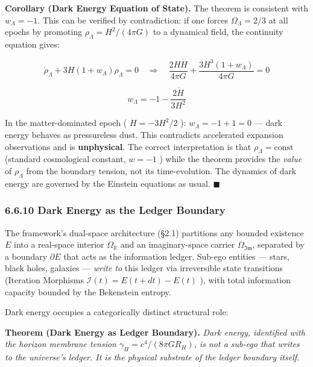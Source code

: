 \documentclass[11pt,a4paper]{article}
\theoremstyle{definition}
\theoremstyle{remark}
\begin{document}
\textbf{Corollary (Dark Energy Equation of State).} The theorem is consistent with $w_\Lambda = -1$. This can be verified by contradiction: if one forces $\Omega_\Lambda = 2/3$ at all epochs by promoting $\rho_\Lambda = H^2/(4\pi G)$ to a dynamical field, the continuity equation gives:


\begin{equation}
\dot{\rho}_\Lambda + 3H(1+w_\Lambda)\rho_\Lambda = 0 \quad \Longrightarrow \quad \frac{2H\dot{H}}{4\pi G} + \frac{3H^3(1+w_\Lambda)}{4\pi G} = 0
\end{equation}



\begin{equation}
w_\Lambda = -1 - \frac{2\dot{H}}{3H^2}
\end{equation}


In the matter-dominated epoch ( $\dot{H} = -3H^2/2$ ): $w_\Lambda = -1 + 1 = 0$ — dark energy behaves as pressureless dust. This contradicts accelerated expansion observations and is \textbf{unphysical}. The correct interpretation is that $\rho_\Lambda = \text{const}$ (standard cosmological constant, $w = -1$ ) while the theorem provides the \textit{value} of $\rho_\Lambda$ from the boundary tension, not its time-evolution. The dynamics of dark energy are governed by the Einstein equations as usual. $\blacksquare$

\subsubsection{6.6.10 Dark Energy as the Ledger Boundary}

The framework's dual-space architecture (\S 2.1) partitions any bounded existence $E$ into a real-space interior $\Omega_{\mathbb{R}}$ and an imaginary-space carrier $\Omega_{\mathfrak{Im}}$, separated by a boundary $\partial E$ that acts as the information ledger. Sub-ego entities — stars, black holes, galaxies — \textit{write to} this ledger via irreversible state transitions (Iteration Morphisms $\mathcal{I}(t) = E(t+dt) - E(t)$ ), with total information capacity bounded by the Bekenstein entropy.

Dark energy occupies a categorically distinct structural role:

\textbf{Theorem (Dark Energy as Ledger Boundary).} \textit{Dark energy, identified with the horizon membrane tension $\gamma_H = c^4/(8\pi G R_H)$, is not a sub-ego that writes to the universe's ledger. It is the physical substrate of the ledger boundary itself.}
\end{document}
